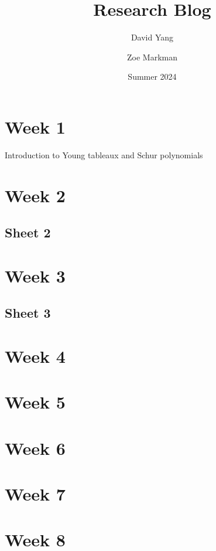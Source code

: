 \documentclass[11pt]{article}
\begin{document}
\title{\textbf{Research Blog}}
\author{David Yang \and Zoe Markman}
\date{Summer 2024}

\maketitle

\section{Week 1}
Introduction to Young tableaux and Schur polynomials

\section{Week 2}


\subsection{Sheet 2}


\newpage

\section{Week 3}


\subsection{Sheet 3}


\newpage

\section{Week 4}


\newpage

\section{Week 5}


\newpage

\section{Week 6}


\newpage
\section{Week 7}


\newpage
\section{Week 8}

\end{document}
